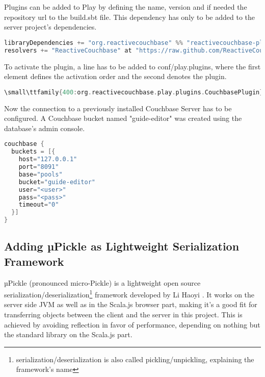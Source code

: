 Plugins can be added to Play by defining the name, version and if needed the repository url to the build.sbt file. This dependency has only to be added to the server project's dependencies.

\begin{lstlisting}[caption={Adding ReactiveCouchbase to Play via build.sbt},basicstyle=\tiny\ttfamily,language=c,aboveskip=15pt]
libraryDependencies += "org.reactivecouchbase" %% "reactivecouchbase-play" % "0.3"
resolvers += "ReactiveCouchbase" at "https://raw.github.com/ReactiveCouchbase/repository/master/releases"
\end{lstlisting}

To activate the plugin, a line has to be added to conf/play.plugins, where the first element defines the activation order and the second denotes the plugin.

\begin{lstlisting}[caption={Activating the plugins via play.plugins},basicstyle=\tiny\ttfamily,language=c,aboveskip=15pt]
\small\ttfamily{400:org.reactivecouchbase.play.plugins.CouchbasePlugin}
\end{lstlisting}

Now the connection to a previously installed Couchbase Server has to be configured. A Couchbase bucket named "guide-editor" was created using the database's admin console.

\begin{lstlisting}[caption={Attaching the driver to the local Couchbase Server},basicstyle=\tiny\ttfamily,language=c,aboveskip=15pt]
couchbase {
  buckets = [{
    host="127.0.0.1"
    port="8091"
    base="pools"
    bucket="guide-editor"
    user="<user>"
    pass="<pass>"
    timeout="0"
  }]
}
\end{lstlisting}

\subsection{Adding µPickle as Lightweight Serialization Framework}

µPickle (pronounced micro-Pickle) is a lightweight open source serialization/deserialization\footnote{serialization/deserialization is also called pickling/unpickling, explaining the framework's name} framework developed by Li Haoyi \cite{upickle}.
It works on the server side JVM as well as in the Scala.js browser part, making it's a good fit for transferring objects between the client and the server in this project. This is achieved by avoiding reflection in favor of performance, depending on nothing but the standard library on the Scala.js part.

